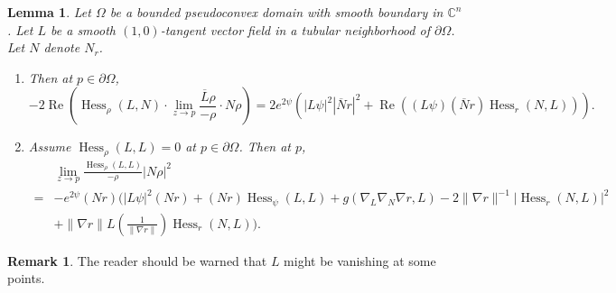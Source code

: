 \documentclass[11pt]{article}
\theoremstyle{plain} \numberwithin{equation}{section}
\newtheorem{lemma}[theorem]{Lemma}
\theoremstyle{definition}
\newtheorem{remark}[theorem]{Remark}
\DeclareMathOperator{\Hessian}{Hess}
\renewcommand{\Re}{\operatorname{Re}}
\begin{document}
	\begin{lemma}\label{calc}
		Let $\Omega$ be a bounded pseudoconvex domain with smooth boundary in $\mathbb{C}^n$. Let $L$ be a smooth $(1,0)$-tangent vector field in a tubular neighborhood of $\partial\Omega$. Let $N$ denote $N_r$.
		\begin{enumerate}
			\item  Then at $p\in \partial\Omega$,	\[
			-2\Re\left(\Hessian_{\rho} (L, N)\cdot\lim\limits_{z\to p}\frac{\overline{L}\rho}{-\rho}\cdot N\rho\right)=
		2e^{2\psi}\left(|L\psi|^2|\overline{N}r|^2+\Re\left((L\psi)(\overline{N}r)\Hessian_r(N, L)\right)\right).
			\]
		\item Assume $\Hessian_\rho(L, L)=0$ at $p\in \partial\Omega$. Then at $p$,	\[\begin{split}
		&\lim\limits_{z\to p}\frac{\Hessian_{\rho} (L, L)}{-\rho}\left|N\rho\right|^2\\=&-e^{2\psi}(Nr)\Bigg(|L\psi|^2(Nr)+(Nr)\Hessian_\psi(L, L)+ g(\nabla_L\nabla_N\nabla r, L)-2\|\nabla r\|^{-1}|\Hessian_r(N, L)|^2\\&+\|\nabla r\|L\left(\frac{1}{\|\nabla r\|}\right)\Hessian_r(N, L)\Bigg).
		\end{split}\]
	\end{enumerate}
	\end{lemma}

\begin{remark}
	The reader should be warned that $L$ might be vanishing at some points.
\end{remark}
	
\end{document}
